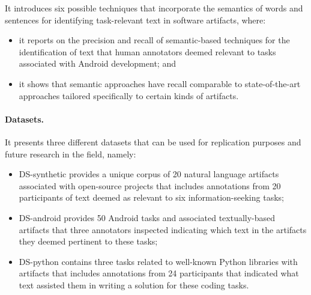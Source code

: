 It introduces six possible techniques that incorporate the semantics of words and sentences for identifying task-relevant text in software artifacts, where:
    
\begin{itemize}
    
    \item it reports on the precision and recall of semantic-based techniques for the identification of text that human annotators deemed relevant to tasks associated with Android development; and
    \item it shows that semantic approaches have recall comparable to state-of-the-art approaches
    tailored specifically to certain kinds of artifacts.
\end{itemize}


\paragraph{\textbf{Datasets.}} 

It presents three different datasets that can be used for replication purposes and future research in the field, namely:
    
\begin{itemize}
    \item \acs{DS-synthetic} provides a unique corpus of 20 natural language artifacts associated
    with open-source projects that includes annotations from 20 participants of text deemed as relevant to six information-seeking tasks;
    
    \item \acs{DS-android} provides 50 Android tasks and associated textually-based artifacts
    that three annotators inspected indicating which text in the artifacts they deemed pertinent to these tasks;

    \item \acs{DS-python} contains three tasks related to well-known Python libraries with artifacts
    that includes annotations from 24 participants that indicated what text assisted them in writing a solution for these coding tasks.
\end{itemize}